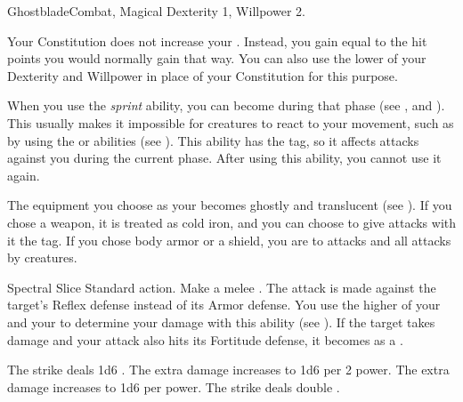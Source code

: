   \begin{magicalfeat}{Ghostblade}{Combat, Magical}
    \featpre Dexterity 1, Willpower 2.

     Your Constitution does not increase your .
    Instead, you gain  equal to the hit points you would normally gain that way.
    You can also use the lower of your Dexterity and Willpower in place of your Constitution for this purpose.

     When you use the \textit{sprint} ability, you can become  during that phase (see , and ).
    This usually makes it impossible for creatures to react to your movement, such as by using the  or  abilities (see ).
    This ability has the  tag, so it affects attacks against you during the current phase.
    After using this ability, you  cannot use it again.

     The equipment you choose as your  becomes ghostly and translucent (see ).
    If you chose a weapon, it is treated as cold iron, and you can choose to give attacks with it the \atCold tag.
    If you chose body armor or a shield, you are  to \atCold attacks and all attacks by  creatures.

    \begin{magicalactiveability}{Spectral Slice}
      \abilityusagetime Standard action.
      \rankline
      Make a melee .
      The attack is made against the target's Reflex defense instead of its Armor defense.
      You use the higher of your  and your  to determine your damage with this ability (see ).
      \hit If the target takes damage and your attack also hits its Fortitude defense, it becomes \slowed as a .

      \rankline
       The strike deals 1d6 .
       The extra damage increases to 1d6  per 2 power.
       The extra damage increases to 1d6  per power.
       The strike deals double .
    \end{magicalactiveability}


\end{magicalfeat}
